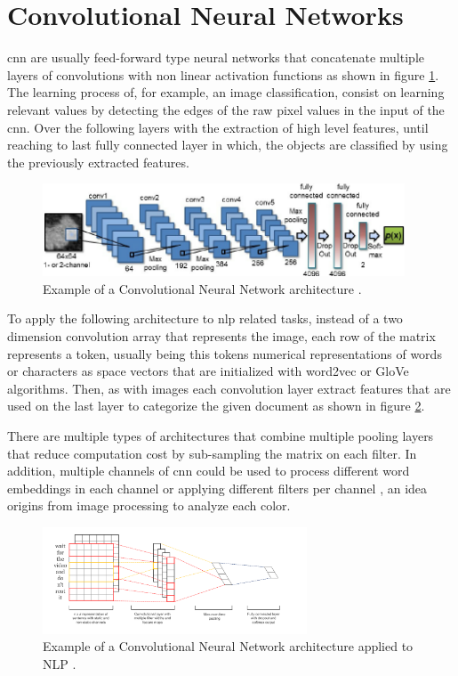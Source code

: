\section{Convolutional Neural Networks}

\acrlong{cnn} are usually feed-forward type neural networks that concatenate multiple layers of convolutions with non linear activation functions as shown in figure \ref{fig:cnn_architecture}. The learning process of, for example, an image classification, consist on learning relevant values by detecting the edges of the raw pixel values in the input of the \acrshort{cnn}. Over the following layers with the extraction of high level features, until reaching to last fully connected layer in which, the objects are classified by using the previously extracted features. 

\begin{figure}[!htp]
  \center
  \includegraphics[width=0.96\textwidth]{figures/cnn_architecture}
  \caption{Example of a Convolutional Neural Network architecture \cite{kooi2017classifying}.}
  \label{fig:cnn_architecture}
\end{figure}

To apply the following architecture to \acrshort{nlp} related tasks, instead of a two dimension convolution array that represents the image, each row of the matrix represents a token, usually being this tokens numerical representations of words or characters as space vectors that are initialized with word2vec or GloVe algorithms. Then, as with images each convolution layer extract features that are used on the last layer to categorize the given document as shown in figure \ref{fig:cnn_npl}. 

There are multiple types of architectures that combine multiple pooling layers that reduce computation cost by sub-sampling the matrix on each filter. In addition, multiple channels of \acrshort{cnn} could be used to process different word embeddings in each channel or applying different filters per channel \cite{singhalborrow}, an idea origins from image processing to analyze each color.

\begin{figure}[htbp]
  \center
  \includegraphics[width=0.7\textwidth]{figures/cnn_npl}
  \caption{Example of a Convolutional Neural Network architecture applied to NLP \cite{kim2014convolutional}.}
  \label{fig:cnn_npl}
\end{figure}
